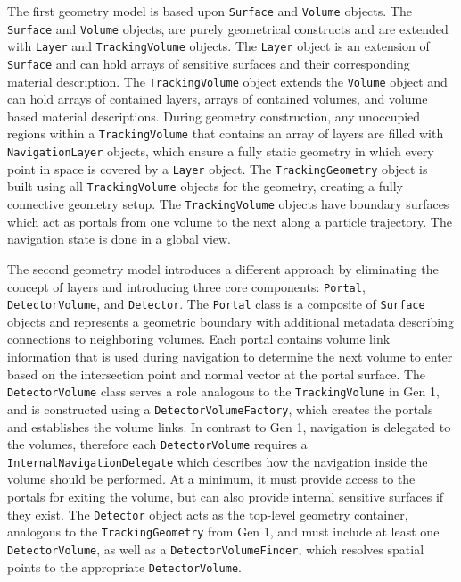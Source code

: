 The first geometry model is based upon \texttt{Surface} and \texttt{Volume} objects. The \texttt{Surface} and \texttt{Volume} objects, are purely geometrical constructs and are extended with \texttt{Layer} and \texttt{TrackingVolume} objects. The \texttt{Layer} object is an extension of \texttt{Surface} and can hold arrays of sensitive surfaces and their corresponding material description. The \texttt{TrackingVolume} object extends the \texttt{Volume} object and can hold arrays of contained layers, arrays of contained volumes, and volume based material descriptions. During geometry construction, any unoccupied regions within a \texttt{TrackingVolume} that contains an array of layers are filled with \texttt{NavigationLayer} objects, which ensure a fully static geometry in which every point in space is covered by a \texttt{Layer} object. The \texttt{TrackingGeometry} object is built using all \texttt{TrackingVolume} objects for the geometry, creating a fully connective geometry setup. The \texttt{TrackingVolume} objects have boundary surfaces which act as portals from one volume to the next along a particle trajectory. The navigation state is done in a global view.

The second geometry model introduces a different approach by eliminating the concept of layers and introducing three core components: \texttt{Portal}, \texttt{DetectorVolume}, and \texttt{Detector}. The \texttt{Portal} class is a composite of \texttt{Surface} objects and represents a geometric boundary with additional metadata describing connections to neighboring volumes. Each portal contains volume link information that is used during navigation to determine the next volume to enter based on the intersection point and normal vector at the portal surface. The \texttt{DetectorVolume} class serves a role analogous to the \texttt{TrackingVolume} in Gen 1, and is constructed using a \texttt{DetectorVolumeFactory}, which creates the portals and establishes the volume links. In contrast to Gen 1, navigation is delegated to the volumes, therefore each \texttt{DetectorVolume} requires a \texttt{InternalNavigationDelegate} which describes how the navigation inside the volume should be performed. At a minimum, it must provide access to the portals for exiting the volume, but can also provide internal sensitive surfaces if they exist. The \texttt{Detector} object acts as the top-level geometry container, analogous to the \texttt{TrackingGeometry} from Gen 1, and must include at least one \texttt{DetectorVolume}, as well as a \texttt{DetectorVolumeFinder}, which resolves spatial points to the appropriate \texttt{DetectorVolume}.

